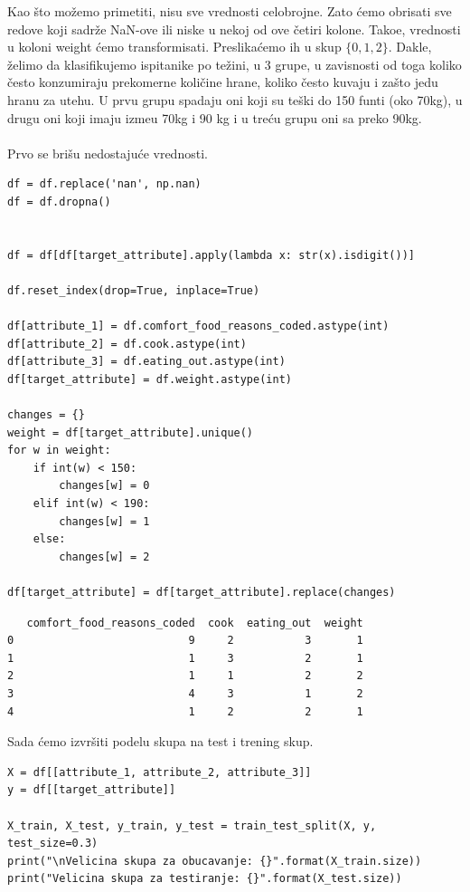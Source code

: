 \documentclass[12pt,a4paper]{article}
\begin{document}
Kao \v sto mo\v zemo primetiti, nisu sve vrednosti celobrojne. Zato \' cemo obrisati sve redove koji sadr\v ze NaN-ove ili niske u nekoj od ove \v cetiri kolone. Tako\dj e, vrednosti u koloni weight \' cemo transformisati. Preslika\' cemo ih u skup $\{0, 1, 2\}$. Dakle, \v zelimo da klasifikujemo ispitanike po te\v zini, u 3 grupe, u zavisnosti od toga koliko \v cesto konzumiraju prekomerne koli\v cine hrane, koliko \v cesto kuvaju i za\v sto jedu hranu za utehu. U prvu grupu spadaju oni koji su te\v ski do 150 funti (oko 70kg), u drugu oni koji imaju izme\dj u 70kg i 90 kg i u tre\' cu grupu oni sa preko 90kg.
\\ \\
Prvo se bri\v su nedostaju\' ce vrednosti.

\begin{lstlisting}[mathescape=true]
df = df.replace('nan', np.nan)
df = df.dropna()


df = df[df[target_attribute].apply(lambda x: str(x).isdigit())]

df.reset_index(drop=True, inplace=True)

df[attribute_1] = df.comfort_food_reasons_coded.astype(int)
df[attribute_2] = df.cook.astype(int)
df[attribute_3] = df.eating_out.astype(int)
df[target_attribute] = df.weight.astype(int)

changes = {}
weight = df[target_attribute].unique()
for w in weight:
    if int(w) < 150:
        changes[w] = 0
    elif int(w) < 190:
        changes[w] = 1
    else:
        changes[w] = 2

df[target_attribute] = df[target_attribute].replace(changes)
\end{lstlisting}

\begin{verbatim}
   comfort_food_reasons_coded  cook  eating_out  weight
0                           9     2           3       1
1                           1     3           2       1
2                           1     1           2       2
3                           4     3           1       2
4                           1     2           2       1
\end{verbatim}

Sada \' cemo izvr\v siti podelu skupa na test i trening skup.

\begin{lstlisting}
X = df[[attribute_1, attribute_2, attribute_3]]
y = df[[target_attribute]]

X_train, X_test, y_train, y_test = train_test_split(X, y, test_size=0.3)
print("\nVelicina skupa za obucavanje: {}".format(X_train.size))
print("Velicina skupa za testiranje: {}".format(X_test.size))
\end{lstlisting}
\end{document}
